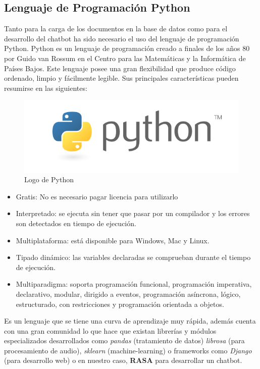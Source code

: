 \newpage
\subsection{Lenguaje de Programación Python}

Tanto para la carga de los documentos en la base de datos como para el desarrollo del chatbot ha sido necesario el uso del lenguaje de programación Python. Python es un lenguaje de programación creado a finales de los años 80 por Guido van Rossum en el Centro para las Matemáticas y la Informática de Países Bajos. Este lenguaje posee una gran flexibilidad que produce código ordenado, limpio y fácilmente legible. Sus principales características pueden resumirse en las siguientes\cite{python}:

\begin{figure}[h]
    \centering
    \includegraphics[scale=0.4]{include/figuras/python.png}
    \caption{Logo de Python}
    \label{fig:Python}
\end{figure}

\begin{itemize}
    \item Gratis: No es necesario pagar licencia para utilizarlo
    \item Interpretado: se ejecuta sin tener que pasar por un compilador y los errores son detectados en tiempo de ejecución.
    \item Multiplataforma: está disponible para Windows, Mac y Linux. 
    \item Tipado dinámico: las variables declaradas se comprueban durante el tiempo de ejecución.
    \item Multiparadigma: soporta programación funcional, programación imperativa, declarativo, modular, dirigido a eventos, programación asíncrona, lógico, estructurado, con restricciones y programación orientada a objetos.
\end{itemize}

Es un lenguaje que se tiene una curva de aprendizaje muy rápida, además cuenta con una gran comunidad lo que hace que existan librerías y módulos especializados desarrollados como \textit{pandas} (tratamiento de datos) \textit{librosa} (para procesamiento de audio), \textit{sklearn} (machine-learning) o frameworks como \textit{Django} (para desarrollo web) o en nuestro caso, \textbf{RASA} para desarrollar un chatbot. 

